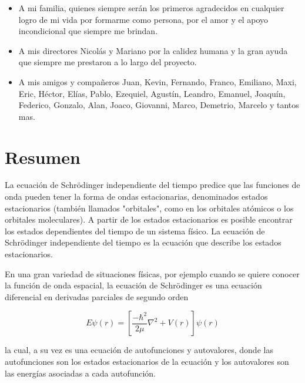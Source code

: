\documentclass[a4paper,openright,12pt, oneside]{book}
\begin{document}
\begin{itemize}
\item A mi familia, quienes siempre ser\'an los primeros agradecidos en
cualquier logro de mi vida por formarme como persona, por el amor y el apoyo incondicional que siempre me brindan.

\item A mis directores Nicol\'as y Mariano por la calidez humana y la gran ayuda que siempre me prestaron a lo largo del proyecto.

\item A mis amigos y compa\~neros Juan, Kevin, Fernando, Franco, Emiliano, Maxi, Eric, H\'ector, El\'ias, Pablo, Ezequiel, Agust\'in, Leandro, Emanuel, Joaqu\'in, Federico, Gonzalo, Alan, Joaco, Giovanni, Marco, Demetrio, Marcelo y tantos mas.

\end{itemize}

\chapter*{\hspace{0.65cm}Resumen} %

La ecuaci\'on de Schr\"odinger independiente del tiempo predice que las funciones de onda pueden tener la forma de ondas estacionarias, denominados estados estacionarios (tambi\'en llamados "orbitales", como en los orbitales at\'omicos o los orbitales moleculares). A partir de los estados estacionarios es posible encontrar los estados dependientes del tiempo de un sistema f\'isico. La ecuaci\'on de Schr\"odinger independiente del tiempo es la ecuaci\'on que describe los estados estacionarios.

En una gran variedad de situaciones f\'isicas, por ejemplo cuando se quiere conocer la funci\'on de onda espacial, la ecuaci\'on de Schr\"odinger es una ecuaci\'on diferencial en derivadas parciales de segundo orden

\begin{displaymath}
    E\psi(r) = \left[\frac{-\hbar^2}{2\mu} \nabla^2 + V(r)\right]\psi(r)
\end{displaymath}

la cual, a su vez es una ecuaci\'on de autofunciones y autovalores, donde las autofunciones son los estados estacionarios de la ecuaci\'on y los autovalores son las energ\'ias asociadas a cada autofunci\'on.
\end{document}
